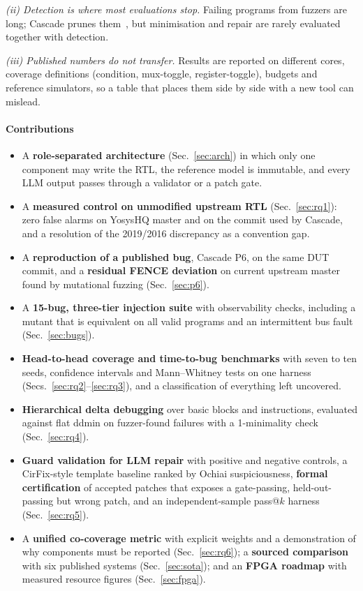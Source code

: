 \documentclass[conference,10pt]{IEEEtran}
\newcommand{\code}[1]{\texttt{\detokenize{#1}}}
\begin{document}
\emph{(ii) Detection is where most evaluations stop.} Failing programs from fuzzers are long; Cascade prunes them~\cite{cascade}, but
minimisation and repair are rarely evaluated together with detection.

\emph{(iii) Published numbers do not transfer.} Results are reported on different cores, coverage definitions (condition,
mux-toggle, register-toggle), budgets and reference simulators, so a table that places them side by side with a new tool can mislead.

\paragraph*{Contributions}
\begin{itemize}
  \item A \textbf{role-separated architecture} (Sec.~\ref{sec:arch}) in which only one component may write the RTL, the reference model
        is immutable, and every LLM output passes through a validator or a patch gate.
  \item A \textbf{measured control on unmodified upstream RTL} (Sec.~\ref{sec:rq1}): zero false alarms on YosysHQ master and on the
        commit used by Cascade, and a resolution of the \code{mem_addr} 2019/2016 discrepancy as a convention gap.
  \item A \textbf{reproduction of a published bug}, Cascade P6, on the same DUT commit, and a \textbf{residual FENCE deviation} on
        current upstream master found by mutational fuzzing (Sec.~\ref{sec:p6}).
  \item A \textbf{15-bug, three-tier injection suite} with observability checks, including a mutant that is equivalent on all valid programs and an intermittent
        bus fault (Sec.~\ref{sec:bugs}).
  \item \textbf{Head-to-head coverage and time-to-bug benchmarks} with seven to ten seeds, confidence intervals and Mann--Whitney tests on one
        harness (Secs.~\ref{sec:rq2}--\ref{sec:rq3}), and a classification of everything left uncovered.
  \item \textbf{Hierarchical delta debugging} over basic blocks and instructions, evaluated against flat ddmin on fuzzer-found failures
        with a 1-minimality check (Sec.~\ref{sec:rq4}).
  \item \textbf{Guard validation for LLM repair} with positive and negative controls, a CirFix-style template baseline ranked by
        Ochiai suspiciousness, \textbf{formal certification} of accepted patches that exposes a gate-passing, held-out-passing but wrong
        patch, and an independent-sample pass@$k$ harness (Sec.~\ref{sec:rq5}).
  \item A \textbf{unified co-coverage metric} with explicit weights and a demonstration of why components must be reported
        (Sec.~\ref{sec:rq6}); a \textbf{sourced comparison} with six published systems (Sec.~\ref{sec:sota}); and an \textbf{FPGA
        roadmap} with measured resource figures (Sec.~\ref{sec:fpga}).
\end{itemize}
\end{document}
